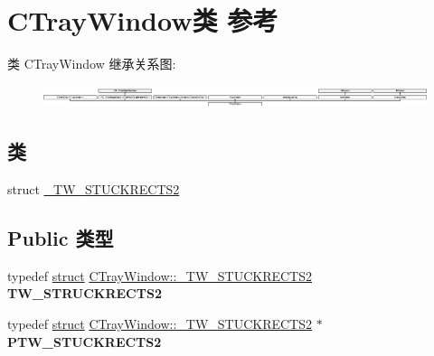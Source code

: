 \hypertarget{class_c_tray_window}{}\section{C\+Tray\+Window类 参考}
\label{class_c_tray_window}
类 C\+Tray\+Window 继承关系图\+:\begin{figure}[H]
\begin{center}
\leavevmode
\includegraphics[height=0.646900cm]{class_c_tray_window}
\end{center}
\end{figure}
\subsection*{类}
\begin{DoxyCompactItemize}
\item 
struct \hyperlink{struct_c_tray_window_1_1___t_w___s_t_u_c_k_r_e_c_t_s2}{\+\_\+\+T\+W\+\_\+\+S\+T\+U\+C\+K\+R\+E\+C\+T\+S2}
\end{DoxyCompactItemize}
\subsection*{Public 类型}
\begin{DoxyCompactItemize}
\item 
\mbox{\label{class_c_tray_window_a7c0e6288852215bc6694ebc2dc5d8f34}} 
typedef \hyperlink{interfacestruct}{struct} \hyperlink{struct_c_tray_window_1_1___t_w___s_t_u_c_k_r_e_c_t_s2}{C\+Tray\+Window\+::\+\_\+\+T\+W\+\_\+\+S\+T\+U\+C\+K\+R\+E\+C\+T\+S2} {\bfseries T\+W\+\_\+\+S\+T\+R\+U\+C\+K\+R\+E\+C\+T\+S2}
\item 
\mbox{\label{class_c_tray_window_ab8855ee7b27760e595cf57792525b981}} 
typedef \hyperlink{interfacestruct}{struct} \hyperlink{struct_c_tray_window_1_1___t_w___s_t_u_c_k_r_e_c_t_s2}{C\+Tray\+Window\+::\+\_\+\+T\+W\+\_\+\+S\+T\+U\+C\+K\+R\+E\+C\+T\+S2} $\ast$ {\bfseries P\+T\+W\+\_\+\+S\+T\+U\+C\+K\+R\+E\+C\+T\+S2}
\end{DoxyCompactItemize}
